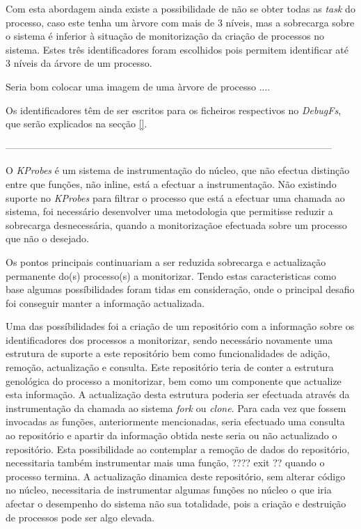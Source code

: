 Com esta abordagem ainda existe a possibilidade de não se obter todas as \textit{task} do processo, caso este tenha um àrvore com mais de 3 níveis, mas a sobrecarga sobre o sistema é inferior à situação de monitorização da criação de processos no sistema.
 Estes três identificadores foram escolhidos pois permitem identificar até 3 níveis da árvore de um processo.

Seria bom colocar uma imagem de uma àrvore de processo .... 

Os identificadores têm de ser escritos para os ficheiros respectivos no \textit{DebugFs}, que serão explicados na secção \ref{}.

-----------------------------------------------------------------------------------------------------

O \textit{KProbes} é um sistema de instrumentação do núcleo, que não efectua distinção entre que funções, não inline, está a efectuar a instrumentação.
Não existindo suporte no \textit{KProbes} para filtrar o processo que está a efectuar uma chamada ao sistema, foi necessário desenvolver uma metodologia que permitisse reduzir a sobrecarga desnecessária, quando a monitorizaçãoe efectuada sobre um processo que não o desejado.

Os pontos principais continuariam a ser reduzida sobrecarga e actualização permanente do(s) processo(s) a monitorizar.
Tendo estas caracteristicas como base algumas possíbilidades foram tidas em consideração, onde o principal desafio foi conseguir manter a informação actualizada.

Uma das possíbilidades foi a criação de um repositório com a informação sobre os identificadores dos processos a monitorizar, sendo necessário novamente uma estrutura de suporte a este repositório bem como funcionalidades de adição, remoção, actualização e consulta.
Este repositório teria de conter a estrutura genológica do processo a monitorizar, bem como um componente que actualize esta informação.
A actualização desta estrutura poderia ser efectuada através da instrumentação da chamada ao sistema \textit{fork} ou \textit{clone}.
Para cada vez que fossem invocadas as funções, anteriormente mencionadas, seria efectuado uma consulta ao repositório e apartir da informação obtida neste seria ou não actualizado o repositório.
Esta possibilidade ao contemplar a remoção de dados do repositório, necessitaria também instrumentar mais uma função, ???? exit ?? quando o processo termina.
A actualização dinamica deste repositório, sem alterar código no núcleo, necessitaria de instrumentar algumas funções no núcleo o que iria afectar o desempenho do sistema não sua totalidade, pois a criação e destruição de processos pode ser algo elevada.




